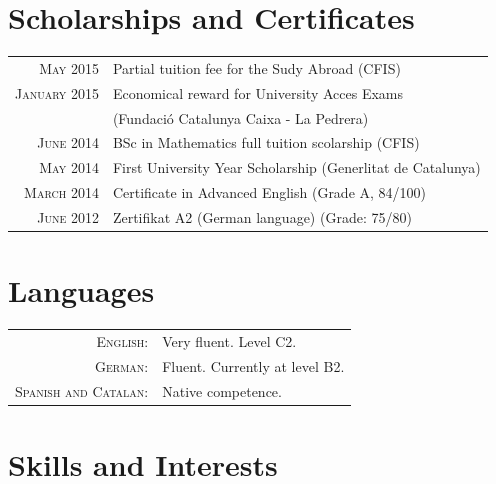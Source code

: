 \documentclass[a4paper,10pt]{article} %
\begin{document}
\section{Scholarships and Certificates}

\begin{tabular}{rl}
\textsc{May} 2015 & Partial tuition fee for the Sudy Abroad \footnotesize (CFIS) \normalsize \\
\textsc{January} 2015 & Economical reward for University Acces Exams \\
 &  (Fundació Catalunya Caixa - La Pedrera) \\
\textsc{June} 2014 & BSc in Mathematics full tuition scolarship
	\footnotesize (CFIS) \normalsize \\
\textsc{May} 2014 & First University Year Scholarship \footnotesize(Generlitat de Catalunya)\normalsize\\
\textsc{March} 2014 & Certificate in Advanced English \footnotesize (Grade A, 84/100) \normalsize \\
\textsc{June} 2012 & Zertifikat A2 (German language) \footnotesize (Grade: 75/80) \normalsize \\
\end{tabular}


\section{Languages}

\begin{tabular}{rl}
\textsc{English:} & Very fluent. Level C2.\\

\textsc{German:} & Fluent. Currently at level B2.\\

\textsc{Spanish and Catalan:} & Native competence.\\
\end{tabular}


\section{Skills and Interests}
\end{document}
